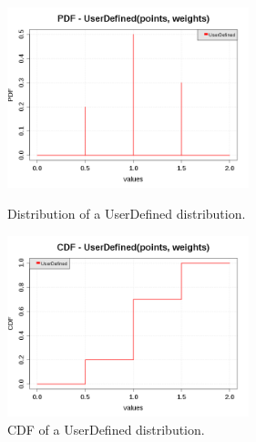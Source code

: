 \begin{figure}[H]
  \begin{minipage}{10cm}
    \begin{center}
      \includegraphics[width=7cm]{pdf_UserDefined.png}
      \caption{Distribution of a  UserDefined distribution.}
      \label{PDFUserDefined}
    \end{center}
  \end{minipage}
  \hfill
  \begin{minipage}{10cm}
    \begin{center}
      \includegraphics[width=7cm]{cdf_UserDefined.png}
      \caption{CDF of a UserDefined distribution.}
      \label{CDFUserDefined}
    \end{center}
  \end{minipage}
\end{figure}



